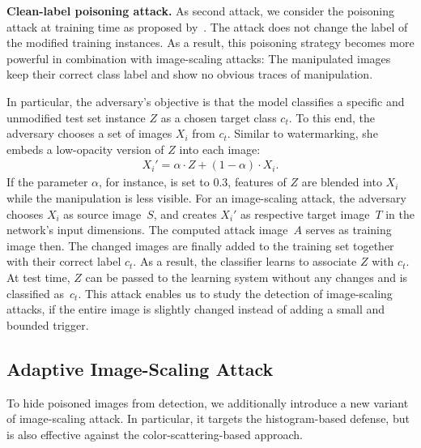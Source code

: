 \documentclass[conference]{IEEEtran}
\renewcommand{\paragraph}[1]{{\vskip 8pt \noindent\bf #1 }}
\newcommand{\srcimg}{\ensuremath{S}\xspace}
\newcommand{\tarimg}{\ensuremath{T}\xspace}
\newcommand{\attimg}{\ensuremath{A}\xspace}
\newcommand{\ti}{\ensuremath{Z}\xspace}
\begin{document}
\paragraph{Clean-label poisoning attack.}
As second attack, we consider the poisoning attack at training time as 
proposed by~\citet{ShaHuaNaj+18}. The attack does not change the label 
of the modified training instances. As a result, this poisoning 
strategy becomes more powerful in combination with image-scaling 
attacks: The manipulated images keep their correct class label and 
show no obvious traces of manipulation. 


In particular, the adversary's {objective\EndAccSupp{}} is that the model 
classifies a specific and unmodified test {set\EndAccSupp{}} instance $\ti$ as a 
chosen target class $c_t$. To this end, the adversary chooses a set of 
images $X_i$ from $c_t$. Similar to watermarking, she embeds a 
low-opacity version of \ti into each image:
\begin{align}
X_i' = \alpha \cdot \ti + (1-\alpha) \cdot X_i .
\end{align}
If the parameter $\alpha$, for instance, is set to 0.3, {features\EndAccSupp{}} of 
$\ti$ are blended into $X_i$ while the manipulation is less 
visible. 
For an image-scaling attack, the adversary chooses $X_i$ as 
source image~\srcimg, and creates $X_i'$ as respective target 
image~\tarimg in the network's input dimensions. The computed attack 
image~\attimg serves as training image then.
The changed images are finally added to the training set together with 
their correct label $c_t$. As a result, the classifier learns to 
associate $\ti$ with $c_t$. At test time, $\ti$ can be passed to the 
learning system without any changes and is classified as~$c_t$. 
This attack enables us to study the detection of image-scaling attacks, 
if the entire image is slightly changed {instead\EndAccSupp{}} of adding a small and 
bounded trigger.




\subsection{Adaptive Image-Scaling Attack}
To hide poisoned images from detection, we additionally introduce a new 
variant of image-scaling attack. In particular, it targets the 
histogram-based defense, but is also effective against the 
color-scattering-based approach.
\end{document}
